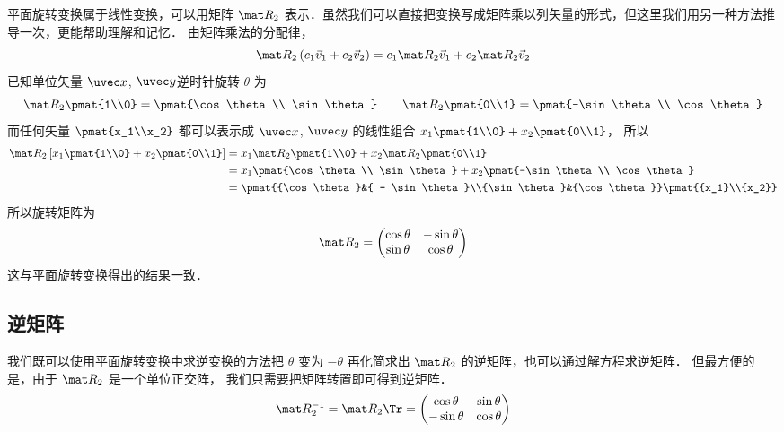 

平面旋转变换属于线性变换，可以用矩阵 $\mat R_2$ 表示．虽然我们可以直接把变换写成矩阵乘以列矢量的形式，但这里我们用另一种方法推导一次，更能帮助理解和记忆． 由矩阵乘法的分配律，
\begin{equation}
\mat R_2\left( {{c_1}{{\vec v}_1} + {c_2}{{\vec v}_2}} \right) = {c_1}\mat R_2 {\vec v_1} + {c_2}\mat R_2 {\vec v_2} 
\end{equation}
已知单位矢量 $\uvec x$, $\uvec y$逆时针旋转 $\theta$ 为
\begin{equation}
\mat R_2\pmat{1\\0} = \pmat{\cos \theta \\ \sin \theta}
\qquad
\mat R_2\pmat{0\\1} = \pmat{-\sin\theta \\ \cos\theta}
\end{equation}
而任何矢量 $\pmat{x_1\\x_2}$ 都可以表示成 $\uvec x$, $\uvec y$ 的线性组合 ${x_1}\pmat{1\\0} + {x_2}\pmat{0\\1}$， 所以
\begin{equation}\begin{split}
\mat R_2\left[x_1 \pmat{1\\0} + x_2 \pmat{0\\1} \right] 
&= x_1 \mat R_2\pmat{1\\0} + x_2 \mat R_2\pmat{0\\1}\\
&= x_1\pmat{\cos \theta \\ \sin \theta} 
  + x_2 \pmat{-\sin\theta \\ \cos\theta} \\
&= \pmat{{\cos \theta }&{ - \sin \theta }\\{\sin \theta }&{\cos \theta }}
\pmat{{x_1}\\{x_2}}
\end{split}\end{equation}
所以旋转矩阵为
\begin{equation}
\mat R_2 = \begin{pmatrix}
{\cos\theta }&{ - \sin\theta }\\
{\sin\theta }&{\cos\theta }
\end{pmatrix}
\end{equation}
这与平面旋转变换得出的结果一致．

\subsection{逆矩阵}
我们既可以使用平面旋转变换中求逆变换的方法把 $\theta$ 变为 $-\theta$ 再化简求出 $\mat R_2$ 的逆矩阵，也可以通过解方程求逆矩阵． 但最方便的是，由于 $\mat R_2$ 是一个单位正交阵， 我们只需要把矩阵转置即可得到逆矩阵．
\begin{equation}
\mat R_2^{-1} = \mat R_2\Tr = \begin{pmatrix}
{\cos\theta }&{\sin\theta }\\
{-\sin\theta }&{\cos\theta }
\end{pmatrix}
\end{equation}

